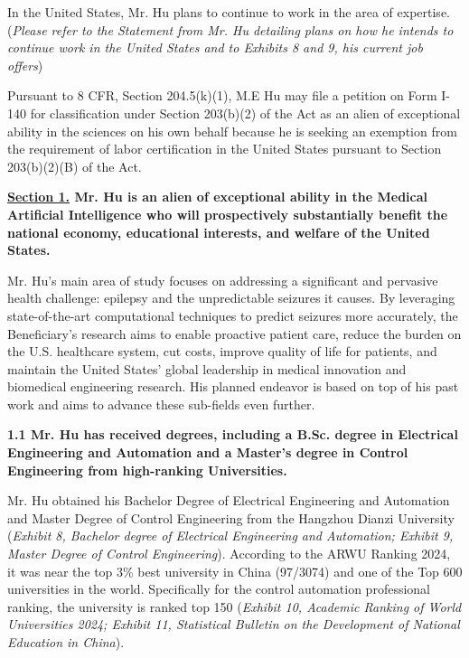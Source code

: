 \documentclass{article}
\begin{document}
In the United States, Mr. Hu plans to continue to work in the area of expertise. ({\it Please refer to the Statement from Mr. Hu detailing plans on how he intends to continue work in the United States and to Exhibits 8 and 9, his current job offers})

Pursuant to 8 CFR, Section 204.5(k)(1), M.E Hu may file a petition on Form I-140 for classification under Section 203(b)(2) of the Act as an alien of exceptional ability in the sciences on his own behalf because he is seeking an exemption from the requirement of labor certification in the United States pursuant to Section 203(b)(2)(B) of the Act.

\clearpage

{\bf \underline{Section 1.} Mr. Hu is an alien of exceptional ability in the Medical Artificial Intelligence who will prospectively substantially benefit the national economy, educational interests, and welfare of the United States.}

Mr. Hu's main area of study focuses on addressing a significant and pervasive health challenge: epilepsy and the unpredictable seizures it causes. By leveraging state-of-the-art computational techniques to predict seizures more accurately, the Beneficiary's research aims to enable proactive patient care, reduce the burden on the U.S. healthcare system, cut costs, improve quality of life for patients, and maintain the United States’ global leadership in medical innovation and biomedical engineering research. His planned endeavor is based on top of his past work and aims to advance these sub-fields even further.

 
{\bf 1.1 Mr. Hu has received degrees, including a B.Sc. degree in Electrical Engineering and Automation and a Master’s degree in Control Engineering  from high-ranking Universities. }

Mr. Hu obtained his Bachelor Degree of Electrical Engineering and Automation and Master Degree of Control Engineering from the Hangzhou Dianzi University ({\it Exhibit 8, Bachelor degree of Electrical Engineering and Automation; Exhibit 9, Master Degree of Control Engineering}). According to the ARWU Ranking 2024, it was near the top 3\%  best university in China (97/3074) and one of the Top 600 universities in the world. Specifically for the control automation professional ranking, the university is ranked top 150 ({\it Exhibit 10, Academic Ranking of World Universities 2024; Exhibit 11, Statistical Bulletin on the Development of National Education in China}). 
\end{document}
